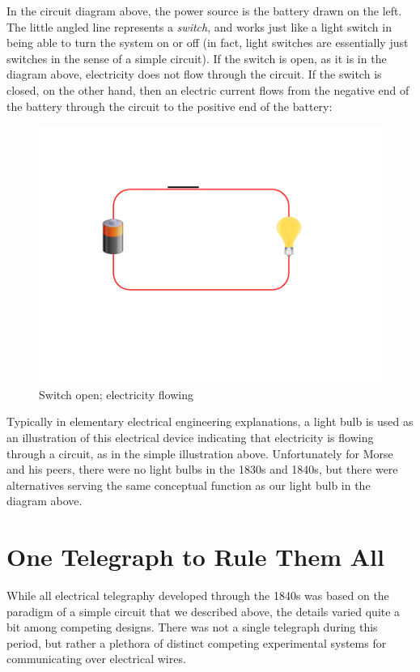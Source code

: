 \documentclass[UTF8]{book}
\begin{document}
\begin{CJK}{UTF8}{gbsn}
In the circuit diagram above, the power source is the battery drawn on the left. The little angled line represents a \emph{switch}, and works just like a light switch in being able to turn the system on or off (in fact, light switches are essentially just switches in the sense of a simple circuit). If the switch is open, as it is in the diagram above, electricity does not flow through the circuit. If the switch is closed, on the other hand, then an electric current flows from the negative end of the battery through the circuit to the positive end of the battery:

\begin{figure}[H]
\centering
\includegraphics[width=0.8\linewidth]{circuit2}
\caption{Switch open; electricity flowing}
\end{figure}

Typically in elementary electrical engineering explanations, a light bulb is used as an illustration of this electrical device indicating that electricity is flowing through a circuit, as in the simple illustration above. Unfortunately for Morse and his peers, there were no light bulbs in the 1830s and 1840s, but there were alternatives serving the same conceptual function as our light bulb in the diagram above.

\section{One Telegraph to Rule Them All}

While all electrical telegraphy developed through the 1840s was based on the paradigm of a simple circuit that we described above, the details varied quite a bit among competing designs. There was not a single telegraph during this period, but rather a plethora of distinct competing experimental systems for communicating over electrical wires.


\end{CJK}
\end{document}
